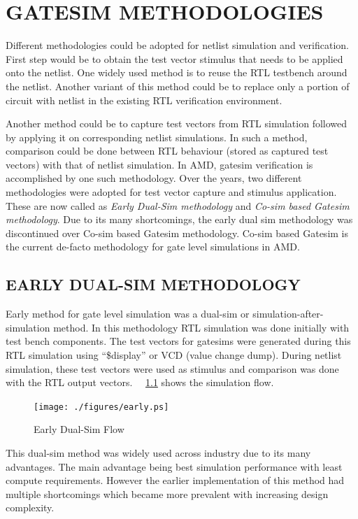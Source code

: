 \chapter{GATESIM METHODOLOGIES}
\label{chap:methodologies.tex}

Different methodologies could be adopted for netlist simulation and verification. First step would be to obtain the test vector stimulus that needs to be applied onto the netlist. One widely used method is to reuse the RTL testbench around the netlist. Another variant of this method could be to replace only a portion of circuit with netlist in the existing RTL verification environment.

Another method could be to capture test vectors from RTL simulation followed by applying it on corresponding netlist simulations. In such a method, comparison could be done between RTL behaviour (stored as captured test vectors) with that of netlist simulation.  In AMD, gatesim verification is accomplished by one such methodology. Over the years, two different methodologies were adopted for test vector capture and stimulus application. These are now called as {\it Early Dual-Sim methodology} and {\it Co-sim based Gatesim methodology}. Due to its many shortcomings, the early dual sim methodology was discontinued over Co-sim based Gatesim methodology. Co-sim based Gatesim is the current de-facto methodology for gate level simulations in AMD.


\section{EARLY DUAL-SIM METHODOLOGY}
Early method for gate level simulation was a dual-sim or simulation-after-simulation method. In this methodology RTL simulation was done initially with test bench components. The test vectors for gatesims were generated during this RTL simulation using ``\$display'' or VCD (value change dump). During netlist simulation, these test vectors were used as stimulus and comparison was done with the RTL output vectors. ~\figurename{~\ref{fig:early.ps}} shows the simulation flow. %

\begin{figure}[h]
\centering
\texttt{[image: ./figures/early.ps]}
\caption{Early Dual-Sim Flow}
\label{fig:early.ps}
\end{figure}

This dual-sim method was widely used across industry due to its many advantages. The main advantage being best simulation performance with least compute requirements. However the earlier implementation of this method had multiple shortcomings which became more prevalent with increasing design complexity.


